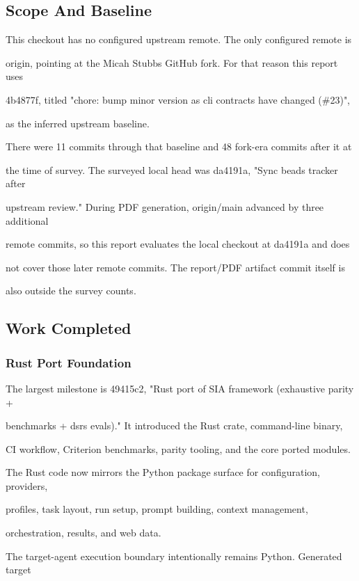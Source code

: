 \documentclass[twocolumn,10pt,letterpaper]{article}
\begin{document}
\subsection{Scope And Baseline}

This checkout has no configured upstream remote. The only configured remote is

origin, pointing at the Micah Stubbs GitHub fork. For that reason this report uses

4b4877f, titled "chore: bump minor version as cli contracts have changed (\#23)",

as the inferred upstream baseline.


There were 11 commits through that baseline and 48 fork-era commits after it at

the time of survey. The surveyed local head was da4191a, "Sync beads tracker after

upstream review." During PDF generation, origin/main advanced by three additional

remote commits, so this report evaluates the local checkout at da4191a and does

not cover those later remote commits. The report/PDF artifact commit itself is

also outside the survey counts.


\subsection{Work Completed}

\subsubsection{Rust Port Foundation}

The largest milestone is 49415c2, "Rust port of SIA framework (exhaustive parity +

benchmarks + dsrs evals)." It introduced the Rust crate, command-line binary,

CI workflow, Criterion benchmarks, parity tooling, and the core ported modules.

The Rust code now mirrors the Python package surface for configuration, providers,

profiles, task layout, run setup, prompt building, context management,

orchestration, results, and web data.


The target-agent execution boundary intentionally remains Python. Generated target
\end{document}
